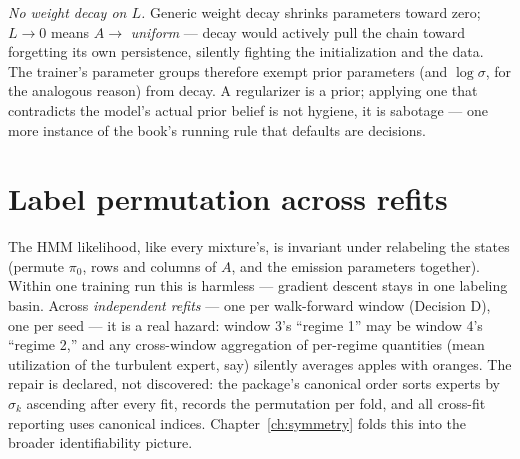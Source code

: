 \emph{No weight decay on $L$.} Generic weight decay shrinks parameters
toward zero; $L \to 0$ means $A \to$ \emph{uniform} --- decay would
actively pull the chain toward forgetting its own persistence, silently
fighting the initialization and the data. The trainer's parameter
groups therefore exempt prior parameters (and $\log\sigma$, for the
analogous reason) from decay. A regularizer is a prior; applying one
that contradicts the model's actual prior belief is not hygiene, it is
sabotage --- one more instance of the book's running rule that defaults
are decisions.

\section{Label permutation across refits}\label{sec:permutation}

The HMM likelihood, like every mixture's, is invariant under relabeling
the states (permute $\pi_0$, rows and columns of $A$, and the emission
parameters together). Within one training run this is harmless ---
gradient descent stays in one labeling basin. Across \emph{independent
refits} --- one per walk-forward window (Decision D), one per seed ---
it is a real hazard: window 3's ``regime 1'' may be window 4's
``regime 2,'' and any cross-window aggregation of per-regime quantities
(mean utilization of the turbulent expert, say) silently averages apples
with oranges. The repair is declared, not discovered: the package's
canonical order sorts experts by $\sigma_k$ ascending after every fit,
records the permutation per fold, and all cross-fit reporting uses
canonical indices. Chapter~\ref{ch:symmetry} folds this into the
broader identifiability picture.

